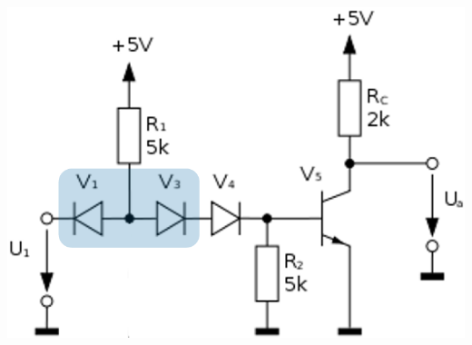 \begin{minipage}[c]{0.3\columnwidth}
    \includegraphics[width=\columnwidth]{images/dtl_zu_ttl.png}
\end{minipage}
\hfill
